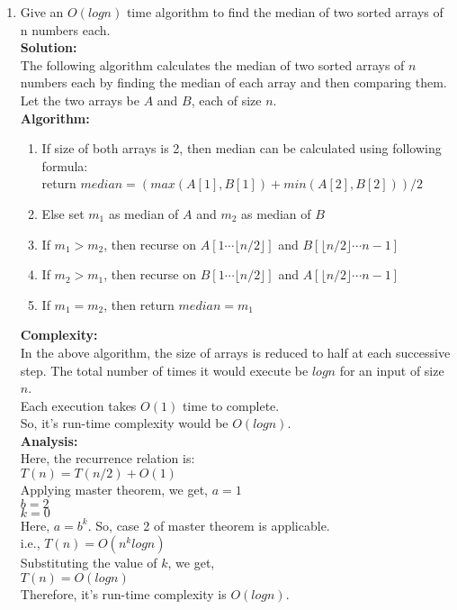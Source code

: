 \documentclass[12pt]{article}
\begin{document}
\begin{enumerate}
\begin{enumerate}
\item Give an $O(logn)$ time algorithm to find the median of two sorted arrays of n numbers each.\\
\textbf{Solution:}\\
The following algorithm calculates the median of two sorted arrays of $n$ numbers each by finding the median of each array and then comparing them.\\
Let the two arrays be $A$ and $B$, each of size $n$.\\
\textbf{Algorithm:}
\begin{enumerate}
\item If size of both arrays is 2, then median can be calculated using following formula:\\
return $median = (max(A[1],B[1]) + min(A[2],B[2]))/2$
\item Else set $m_1$ as median of $A$ and $m_2$ as median of $B$
\item If $m_1 > m_2$, then recurse on $A[1 \cdots \lfloor n/2 \rfloor]$ and $B[\lfloor n/2 \rfloor \cdots n -1]$
\item If $m_2 > m_1$, then recurse on $B[1 \cdots \lfloor n/2 \rfloor]$ and $A[\lfloor n/2 \rfloor \cdots n -1]$
\item If $m_1 = m_2$, then return $median = m_1$
\end{enumerate}
\textbf{Complexity:}\\
In the above algorithm, the size of arrays is reduced to half at each successive step.
The total number of times it would execute be $log n$ for an input of size $n$.\\
Each execution takes $O(1)$ time to complete.\\
So, it's run-time complexity would be $O(log n)$.\\
\textbf{Analysis:}\\
Here, the recurrence relation is:\\
$T(n) = T(n/2) + O(1)$\\
Applying master theorem, we get,
$a = 1$\\
$b = 2$\\
$k = 0$\\
Here, $a = b^k$. So, case 2 of master theorem is applicable.\\
i.e., $T(n) = O(n^k log n)$\\
Substituting the value of $k$, we get,\\
$T(n) = O(log n)$\\
Therefore, it's run-time complexity is $O(log n)$.\\
\end{enumerate} 


\end{enumerate}
\end{document}
